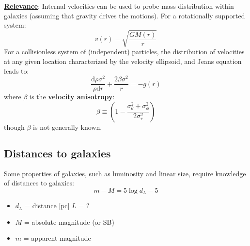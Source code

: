 \documentclass{article}
\newcommand{\mynotes}[1]{\textcolor{cadmiumgreen}{#1}}
\begin{document}
\underline{\textbf{Relevance}}:
Internal velocities can be used to probe mass distribution within
galaxies (assuming that gravity drives the motions).
For a rotationally supported system:
\[
    v(r) = \sqrt{\frac{GM(r)}{r}}
    \]
For a collisionless system of \mynotes{(independent)} particles,
the distribution of velocities at
any given location characterized by the velocity ellipsoid, and
Jeans equation leads to:
\[
    \frac{\mathrm{d}\rho\sigma^{2}}{\rho{\mathrm{d}r}} +
    \frac{2\beta\sigma^{2}}{r} = -g(r)
    \]
where $\beta$ is the \textbf{velocity anisotropy}:
\[
    \beta \equiv \left(1-
    \frac{\sigma_{\theta}^{2}+\sigma_{\phi}^{2}}{2\sigma_{r}^{2}}\right)
    \]
though $\beta$ is not generally known.

\subsection{Distances to galaxies}
Some properties of galaxies, such as luminosity and linear size,
require knowledge of distances to galaxies:
\[
    m-M = 5\log{d_{L}}-5
\]
\begin{itemize}
    \item $d_{L}$ = distance [pc] \mynotes{$L$ = ?}
    \item $M$ = absolute magnitude (or SB)
    \item $m$ = apparent magnitude
\end{itemize}
\end{document}
